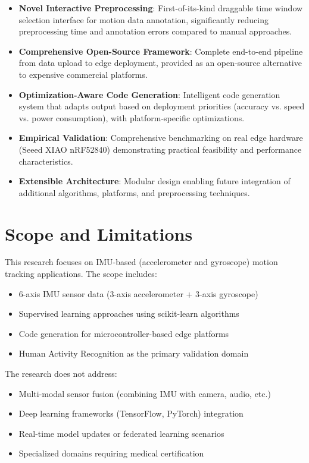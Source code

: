 \begin{itemize}
\item \textbf{Novel Interactive Preprocessing}: First-of-its-kind draggable time window selection interface for motion data annotation, significantly reducing preprocessing time and annotation errors compared to manual approaches.

\item \textbf{Comprehensive Open-Source Framework}: Complete end-to-end pipeline from data upload to edge deployment, provided as an open-source alternative to expensive commercial platforms.

\item \textbf{Optimization-Aware Code Generation}: Intelligent code generation system that adapts output based on deployment priorities (accuracy vs. speed vs. power consumption), with platform-specific optimizations.

\item \textbf{Empirical Validation}: Comprehensive benchmarking on real edge hardware (Seeed XIAO nRF52840) demonstrating practical feasibility and performance characteristics.

\item \textbf{Extensible Architecture}: Modular design enabling future integration of additional algorithms, platforms, and preprocessing techniques.

\end{itemize}

\section{Scope and Limitations}

This research focuses on IMU-based (accelerometer and gyroscope) motion tracking applications. The scope includes:

\begin{itemize}
\item 6-axis IMU sensor data (3-axis accelerometer + 3-axis gyroscope)
\item Supervised learning approaches using scikit-learn algorithms
\item Code generation for microcontroller-based edge platforms
\item Human Activity Recognition as the primary validation domain
\end{itemize}

The research does not address:

\begin{itemize}
\item Multi-modal sensor fusion (combining IMU with camera, audio, etc.)
\item Deep learning frameworks (TensorFlow, PyTorch) integration
\item Real-time model updates or federated learning scenarios
\item Specialized domains requiring medical certification
\end{itemize}

